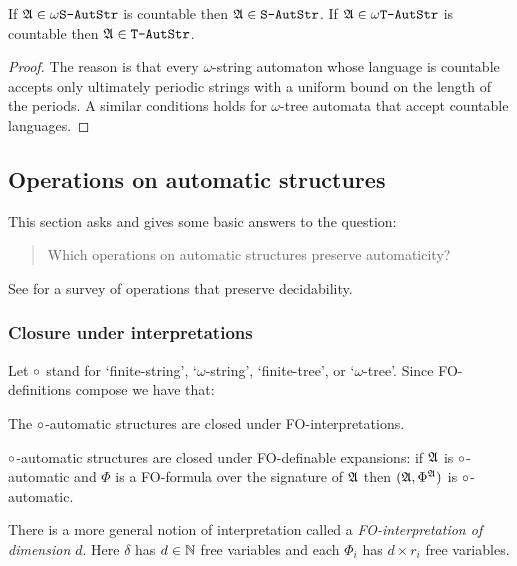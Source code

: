 \begin{proposition} 
If $\mathfrak{A} \in \mbox{\tt $\omega$S-AutStr}$ is countable then $\mathfrak{A} \in \mbox{\tt S-AutStr}$.
If $\mathfrak{A} \in \mbox{\tt $\omega$T-AutStr}$ is countable then $\mathfrak{A} \in \mbox{\tt T-AutStr}$.
\end{proposition}

\begin{proof}
The reason is that every $\omega$-string automaton whose language is countable accepts only ultimately periodic strings with a uniform bound on the length of the periods. A similar conditions holds for $\omega$-tree automata that accept countable languages.
\end{proof}
%
\subsection{Operations on automatic structures}

This section asks and gives some basic answers to the question:
\begin{quote}
Which operations on automatic structures preserve automaticity?
\end{quote}
 See \cite{BCL07} for a survey of operations that preserve decidability.
 
\subsubsection*{Closure under interpretations}
Let $\circ$ stand for `finite-string', `$\omega$-string', `finite-tree', or `$\omega$-tree'.
Since FO-definitions compose we have that:
\begin{proposition} \cite{Blum99}
The $\circ$-automatic structures are closed under FO-interpretations.
\end{proposition}

\begin{example}
$\circ$-automatic structures are closed under FO-definable expansions: if $\mathfrak{A}$ is $\circ$-automatic and $\Phi$ is a FO-formula over the signature of $\mathfrak{A}$ then $(\mathfrak{A},\Phi^{\mathfrak{A}})$ is $\circ$-automatic.
\end{example}

There is a more general notion of interpretation called a {\em FO-interpretation of dimension $d$}.
Here $\delta$ has $d \in \mathbb{N}$ free variables and each $\Phi_i$ has $d\times r_i$ free variables.

